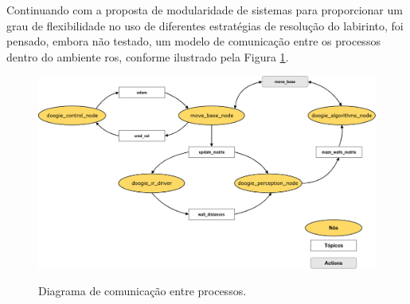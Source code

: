 Continuando com a proposta de modularidade de sistemas para proporcionar um grau de flexibilidade no uso de diferentes estratégias de resolução do labirinto, foi pensado, embora não testado, um modelo de comunicação entre os processos dentro do ambiente \gls*{ros}, conforme ilustrado pela Figura \ref{fig:doogie_ros_graph}.

\begin{figure}[H]
	\centering
	\caption{Diagrama de comunicação entre processos.}
	\includegraphics[width=1\textwidth]
	{Figures/doogie_ros_graph}
	\label{fig:doogie_ros_graph}
\end{figure}

